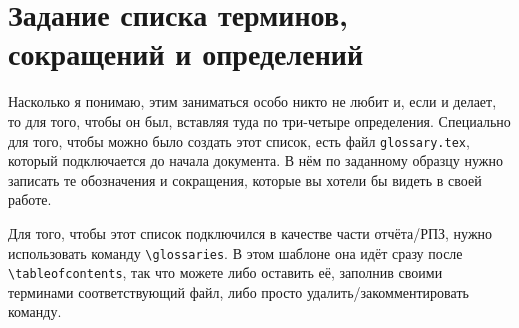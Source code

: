 \section{Задание списка терминов, сокращений и определений}

Насколько я понимаю, этим заниматься особо никто не любит и, если и делает, то для того, чтобы он был, вставляя туда по три-четыре определения. Специально для того, чтобы можно было создать этот список, есть файл \texttt{glossary.tex}, который подключается до начала документа. В нём по заданному образцу нужно записать те обозначения и сокращения, которые вы хотели бы видеть в своей работе. 

Для того, чтобы этот список подключился в качестве части отчёта/РПЗ, нужно использовать команду \texttt{\textbackslash glossaries}. В этом шаблоне она идёт сразу после \texttt{\textbackslash tableofcontents}, так что можете либо оставить её, заполнив своими терминами соответствующий файл, либо просто удалить/закомментировать команду.